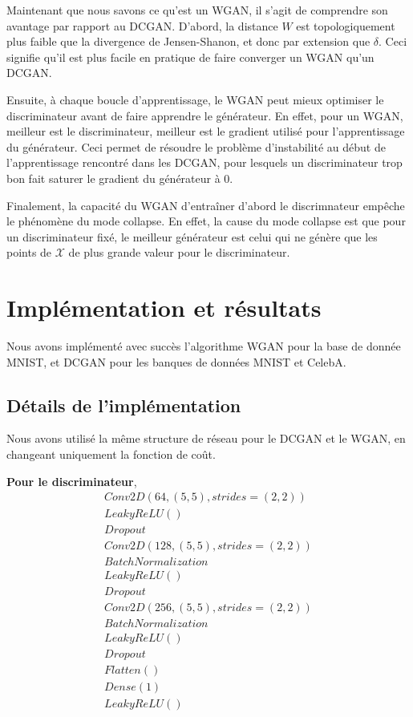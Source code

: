 Maintenant que nous savons ce qu'est un WGAN, il s'agit de comprendre son avantage par rapport au DCGAN. D'abord, la distance $W$ est topologiquement plus faible que la divergence de Jensen-Shanon, et donc par extension que $\delta$. Ceci signifie qu'il est plus facile en pratique de faire converger un WGAN qu'un DCGAN.

Ensuite, à chaque boucle d'apprentissage, le WGAN peut mieux optimiser le discriminateur avant de faire apprendre le générateur. En effet, pour un WGAN, meilleur est le discriminateur, meilleur est le gradient utilisé pour l'apprentissage du générateur. Ceci permet de résoudre le problème d'instabilité au début de l'apprentissage rencontré dans les DCGAN, pour lesquels un discriminateur trop bon fait saturer le gradient du générateur à 0.

Finalement, la capacité du WGAN d'entraîner d'abord le discrimnateur empêche le phénomène du mode collapse. En effet, la cause du mode collapse est que pour un discriminateur fixé, le meilleur générateur est celui qui ne génère que les points de $\mathcal{X}$ de plus grande valeur pour le discriminateur.

\section{Implémentation et résultats}

Nous avons implémenté avec succès l'algorithme WGAN pour la base de donnée MNIST, et  DCGAN pour les banques de données MNIST et CelebA. 

\subsection{Détails de l'implémentation}

Nous avons utilisé la même structure de réseau pour le DCGAN et le WGAN, en changeant uniquement la fonction de coût.


\textbf{Pour le discriminateur},
\[ \begin{array}{lcr}
Conv2D(64, (5,5), strides=(2,2)) \\
LeakyReLU() \\
Dropout\\

Conv2D(128, (5,5), strides=(2,2)) \\
BatchNormalization\\
LeakyReLU()\\
Dropout\\

Conv2D(256, (5,5), strides=(2,2)) \\
BatchNormalization\\
LeakyReLU()\\
Dropout\\


Flatten()\\
Dense(1)\\
LeakyReLU()\\

\end{array}\]

